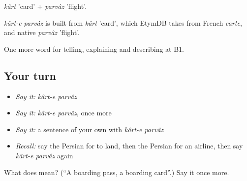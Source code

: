 \emph{kârt} 'card' + \emph{parvâz} 'flight'.

\begin{cousinweb}
\emph{kârt-e parvâz} is built from \emph{kârt} 'card', which EtymDB takes from French \emph{carte}, and native \emph{parvâz} 'flight'.
\end{cousinweb}

\begin{grammarlens}[title={What you've built}]
One more word for telling, explaining and describing at B1.
\end{grammarlens}

\subsection*{Your turn}
\begin{itemize}
\raggedright
  \item \emph{Say it:} \emph{kârt-e parvâz}
  \item \emph{Say it:} \emph{kârt-e parvâz}, once more
  \item \emph{Say it:} a sentence of your own with \emph{kârt-e parvâz}
  \item \emph{Recall:} say the Persian for to land, then the Persian for an airline, then say \emph{kârt-e parvâz} again
\end{itemize}

\begin{tcolorbox}[breakable,colback=teal!4,colframe=teal!35!black,title={Before you move on}]
What does   mean? (\textquotedblleft{}A boarding pass, a boarding card\textquotedblright{}.) Say it once more.
\end{tcolorbox}
